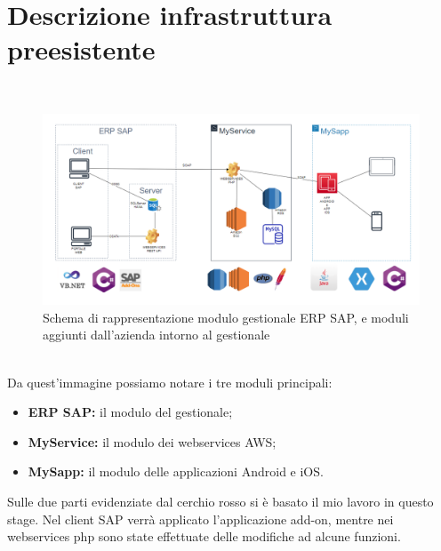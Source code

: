 
\chapter{Descrizione infrastruttura preesistente}
\label{cap:descrizione-architettura}

\\
\begin{figure}[!h] 
	\centering 
	\includegraphics[scale = 0.4]{immagini/architettura-globale.png} 
	\caption{Schema di rappresentazione modulo gestionale ERP SAP, e moduli aggiunti dall'azienda intorno al gestionale}
\end{figure}\\
Da quest'immagine possiamo notare i tre moduli principali:
\begin{itemize}
	\item \textbf{ERP SAP:} il modulo del gestionale;
	\item \textbf{MyService:} il modulo dei webservices AWS;
	\item \textbf{MySapp:} il modulo delle applicazioni Android e iOS.\\
\end{itemize}
Sulle due parti evidenziate dal cerchio rosso si è basato il mio lavoro in questo stage.
Nel client SAP verrà applicato l'applicazione add-on, mentre nei webservices php sono state effettuate delle modifiche ad alcune funzioni.
